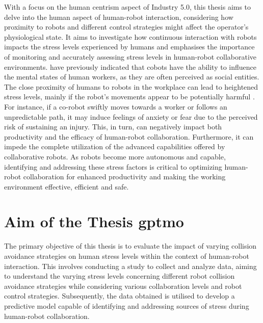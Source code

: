 With a focus on the human centrism aspect of Industry 5.0, this thesis aims to delve into the human aspect of human-robot interaction, considering how proximity to robots and different control strategies might affect the operator's physiological state. It aims to investigate how continuous interaction with robots impacts the stress levels experienced by humans and emphasises the importance of monitoring and accurately assessing stress levels in human-robot collaborative environments. \textcite{Saupp} have previously indicated that cobots have the ability to influence the mental states of human workers, as they are often perceived as social entities. The close proximity of humans to robots in the workplace can lead to heightened stress levels, mainly if the robot's movements appear to be potentially harmful \parencite{Lasota}. For instance, if a co-robot swiftly moves towards a worker or follows an unpredictable path, it may induce feelings of anxiety or fear due to the perceived risk of sustaining an injury. This, in turn, can negatively impact both productivity and the efficacy of human-robot collaboration. Furthermore, it can impede the complete utilization of the advanced capabilities offered by collaborative robots. As robots become more autonomous and capable, identifying and addressing these stress factors is critical to optimizing human-robot collaboration for enhanced productivity and making the working environment effective, efficient and safe. 


\section{Aim of the Thesis \gls*{gptmo}}

The primary objective of this thesis is to evaluate the impact of varying collision avoidance strategies on human stress levels within the context of human-robot interaction. This involves conducting a study to collect and analyze data, aiming to understand the varying stress levels concerning different robot collision avoidance strategies while considering various collaboration levels and robot control strategies. Subsequently, the data obtained is utilised to develop a predictive model capable of identifying and addressing sources of stress during human-robot collaboration.


